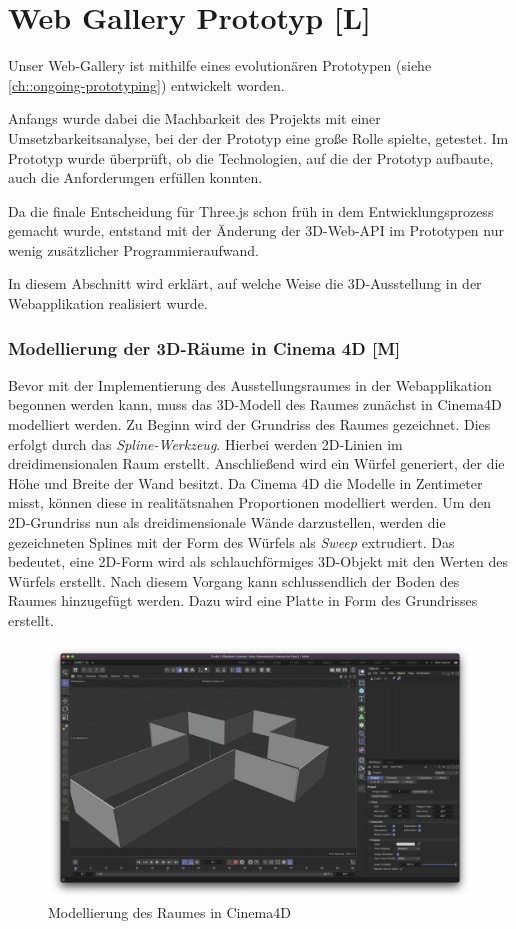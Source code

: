 \section{Web Gallery Prototyp [L]}
Unser Web-Gallery ist mithilfe eines evolutionären Prototypen (siehe  \ref{ch::ongoing-prototyping}) entwickelt worden.


Anfangs wurde dabei die Machbarkeit des Projekts mit einer Umsetzbarkeitsanalyse, bei der der Prototyp eine große Rolle spielte, getestet. Im Prototyp wurde überprüft, ob die Technologien, auf die der Prototyp aufbaute, auch die Anforderungen erfüllen konnten.

Da die finale Entscheidung für Three.js schon früh in dem Entwicklungsprozess gemacht wurde, entstand mit der Änderung der 3D-Web-API im Prototypen nur wenig zusätzlicher Programmieraufwand.

In diesem Abschnitt wird erklärt, auf welche Weise die 3D-Ausstellung in der Webapplikation realisiert wurde.

\subsubsection{Modellierung der 3D-Räume in Cinema 4D [M]}
Bevor mit der Implementierung des Ausstellungsraumes in der Webapplikation begonnen werden kann, muss das 3D-Modell des Raumes zunächst in Cinema4D modelliert werden. Zu Beginn wird der Grundriss des Raumes gezeichnet. Dies erfolgt durch das \emph{Spline-Werkzeug}. Hierbei werden 2D-Linien im dreidimensionalen Raum erstellt. Anschließend wird ein Würfel generiert, der die Höhe und Breite der Wand besitzt. Da Cinema 4D die Modelle in Zentimeter misst, können diese in realitätsnahen Proportionen modelliert werden. Um den 2D-Grundriss nun als dreidimensionale Wände darzustellen, werden die gezeichneten Splines mit der Form des Würfels als \emph{Sweep} extrudiert. Das bedeutet, eine 2D-Form wird als schlauchförmiges 3D-Objekt mit den Werten des Würfels erstellt. Nach diesem Vorgang kann schlussendlich der Boden des Raumes hinzugefügt werden. Dazu wird eine Platte in Form des Grundrisses erstellt. 

\begin{figure} [h t]
    \centering
    \includegraphics[scale=0.2]{pics/Room-model.png}
    \caption{Modellierung des Raumes in Cinema4D}
    \label{fig:tech:front:room-model}
  \end{figure}

